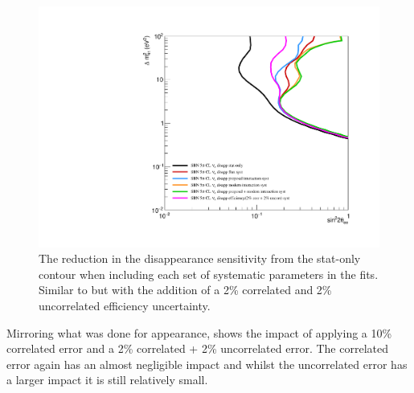 \begin{figure}[h!]
    \centering
    \includegraphics[width = \largefigwidth]{figures-chap6/exclusion_contours/nue_disapp_syst_groups+det.pdf}
     \caption[\nue disappearance sensitivity reduction from different systematic groups with a (2+2)\% efficiency uncertainty.]{The reduction in the \nue disappearance sensitivity from the stat-only contour when including each set of systematic parameters in the fits. Similar to  but with the addition of a 2\% correlated and 2\% uncorrelated efficiency uncertainty.}
    \label{fig:nue_disapp_syst_groups_detector}
\end{figure}

Mirroring what was done for \nue appearance,  shows the impact of applying a 10\% correlated error and a 2\% correlated + 2\% uncorrelated error. The correlated error again has an almost negligible impact and whilst the uncorrelated error has a larger impact it is still relatively small. 

